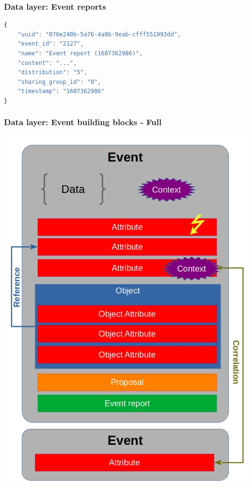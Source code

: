 \begin{frame}[fragile]
    \frametitle{Data layer: Event reports}
    \begin{lstlisting}[language=javascript,firstnumber=1]
{
    "uuid": "076e240b-5a76-4a8b-9eab-cfff551993dd",
    "event_id": "2127",
    "name": "Event report (1607362986)",
    "content": "...",
    "distribution": "5",
    "sharing_group_id": "0",
    "timestamp": "1607362986"
}
\end{lstlisting}
\end{frame}

\begin{frame}
    \frametitle{Data layer: Event building blocks - Full}
        \begin{center}
            \includegraphics[scale=0.30]{screenshots/event-building-blocks/full.png}
        \end{center}
\end{frame}

